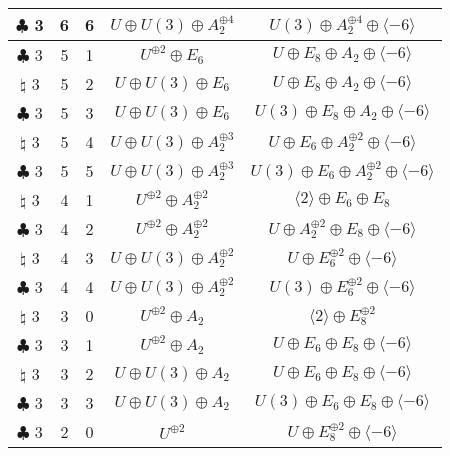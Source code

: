 \documentclass{amsart}
\theoremstyle{definition}
\begin{document}
\begin{table}[p]
\begin{tabular}{c|c|c|c|c}
 $\clubsuit$ 3&6&6&$U\oplus U(3)\oplus  A_2^{\oplus 4}$&$U(3)\oplus A_2^{\oplus 4}\oplus \langle -6\rangle$\\
 \hline
 
 $\clubsuit$ 3&5&1&$U^{\oplus 2}\oplus E_6$&$U\oplus E_8\oplus A_2\oplus \langle -6\rangle$\\
 
 $\natural$ 3&5&2&$U\oplus U(3)\oplus E_6$&$U\oplus E_8\oplus A_2\oplus \langle -6\rangle$\\
 
 $\clubsuit$ 3&5&3&$U\oplus U(3)\oplus E_6$&$U(3) \oplus E_8 \oplus A_2\oplus \langle -6\rangle$\\
 
 $\natural$ 3&5&4&$U\oplus U(3)\oplus A_2^{\oplus 3}$&$U\oplus E_6 \oplus A_2^{\oplus 2}\oplus \langle -6\rangle$\\
 
 $\clubsuit$ 3&5&5&$U\oplus U(3)\oplus A_2^{\oplus 3}$&$U(3)\oplus E_6 \oplus A_2^{\oplus 2}\oplus \langle -6\rangle$\\
 \hline 

 $\natural$ 3&4&1&$U^{\oplus 2} \oplus A_2^{\oplus 2}$&$\langle 2\rangle \oplus E_6 \oplus E_8$\\ 
 
 $\clubsuit$ 3&4&2&$U^{\oplus 2} \oplus A_2^{\oplus 2}$&$U\oplus A_2^{\oplus 2}\oplus E_8 \oplus \langle -6\rangle$\\
 
 $\natural$ 3&4&3&$U\oplus U(3)\oplus A_2^{\oplus 2}$&$U\oplus E_6^{\oplus 2}\oplus \langle -6\rangle$\\
 
 $\clubsuit$ 3&4&4&$U\oplus U(3)\oplus A_2^{\oplus 2}$&$U(3)\oplus E_6^{\oplus 2}\oplus \langle -6\rangle$\\
 \hline
 
 $\natural$ 3&3&0&$U^{\oplus 2}\oplus A_2$&$\langle 2 \rangle \oplus E_8^{\oplus 2}$\\
 
 $\clubsuit$ 3&3&1&$U^{\oplus 2}\oplus A_2$&$U\oplus E_6\oplus E_8\oplus \langle -6\rangle$\\
 
 $\natural$ 3&3&2&$U\oplus U(3)\oplus A_2$&$U\oplus E_6\oplus E_8\oplus \langle -6\rangle$\\
 
 $\clubsuit$ 3&3&3&$U\oplus U(3)\oplus A_2$&$U(3)\oplus E_6\oplus E_8 \oplus \langle -6\rangle$\\
 \hline
 $\clubsuit$ 3&2&0&$U^{\oplus 2}$&$U\oplus E_8^{\oplus 2}\oplus \langle -6\rangle$\\
 

\end{tabular}
\end{table}
\end{document}

